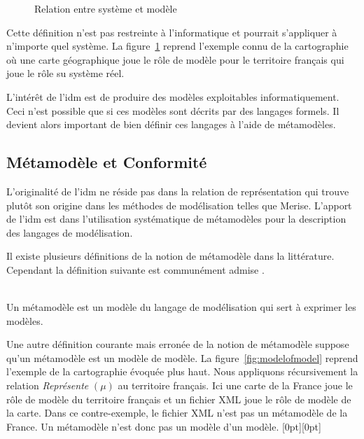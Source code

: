 \begin{figure}[!ht]
    \begin{center}
    
    \end{center}
    \caption{Relation entre système et modèle \protect\cite{favre2006ingenierie}}
    \label{fig:systemModele}
\end{figure}

Cette définition n'est pas restreinte à l'informatique et pourrait s'appliquer à 
n'importe quel système. 
La figure~\ref{fig:systemModele} reprend l'exemple connu de la cartographie où 
une carte géographique joue le rôle de modèle pour le territoire français qui joue le rôle su système réel.

L'intérêt de l'\gls{idm} est de produire des modèles exploitables informatiquement. 
Ceci n'est possible que si ces modèles sont décrits par des langages formels. Il 
devient alors important de bien définir ces langages à l'aide de métamodèles.

\subsection{Métamodèle et Conformité}
L'originalité de l'\gls{idm} ne réside pas dans la relation de représentation qui 
trouve plutôt son origine dans les méthodes de modélisation telles que Merise. L'apport de l'\gls{idm} est dans l'utilisation systématique de métamodèles pour la description des langages de modélisation. 

Il existe plusieurs définitions de la notion de métamodèle dans la littérature. 
Cependant la définition suivante est communément admise \cite{bezivin2004rapport}.
\\\

\begin{definition}
Un métamodèle est un modèle du langage de modélisation qui sert à exprimer les 
modèles.
\end{definition}

Une autre définition courante mais erronée de la notion de métamodèle suppose 
qu'un métamodèle est un modèle de modèle. La figure~\ref{fig:modelofmodel} 
reprend l'exemple de la cartographie évoquée plus haut. Nous appliquons 
récursivement la relation \textit{Représente} $(\mu)$ au territoire 
français. Ici une carte de la France joue le rôle de modèle du territoire 
français et un fichier XML joue le rôle de modèle de la carte. Dans ce contre-exemple, le fichier XML n'est pas un métamodèle de la France. Un métamodèle 
n'est donc pas un modèle d'un modèle.
\hspace{-11cm}\raisebox{-5mm}[0pt][0pt]{%
}

